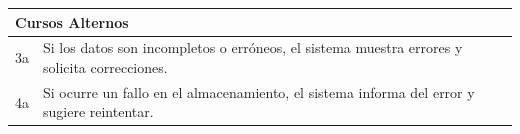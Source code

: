        \begin{table}[H]
            \begin{tabular}{llllllll}
        \hline
        \multicolumn{8}{|l|}{\cellcolor[HTML]{F2F2F2}Cursos Alternos}                                                                                                                                                                                                                                                                                \\ \hline
        \multicolumn{1}{|c|}{3a} & \multicolumn{7}{p{15cm}|}{{\color[HTML]{808080} Si los datos son incompletos o erróneos, el sistema muestra errores y solicita correcciones.}}                                                                                                                                      \\ \hline
        \multicolumn{1}{|c|}{4a} & \multicolumn{7}{p{15cm}|}{{\color[HTML]{808080} Si ocurre un fallo en el almacenamiento, el sistema informa del error y sugiere reintentar.}}                                                                                                                                      \\ \hline
        \end{tabular}
        \end{table}

